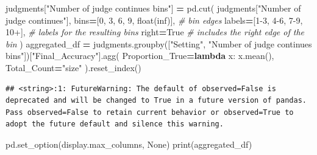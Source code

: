 \documentclass[
]{article}
\newenvironment{Shaded}{\begin{snugshade}}{\end{snugshade}}
\newcommand{\BuiltInTok}[1]{#1}
\newcommand{\CommentTok}[1]{\textcolor[rgb]{0.56,0.35,0.01}{\textit{#1}}}
\newcommand{\DecValTok}[1]{\textcolor[rgb]{0.00,0.00,0.81}{#1}}
\newcommand{\KeywordTok}[1]{\textcolor[rgb]{0.13,0.29,0.53}{\textbf{#1}}}
\newcommand{\NormalTok}[1]{#1}
\newcommand{\OperatorTok}[1]{\textcolor[rgb]{0.81,0.36,0.00}{\textbf{#1}}}
\newcommand{\StringTok}[1]{\textcolor[rgb]{0.31,0.60,0.02}{#1}}
\newcommand{\VariableTok}[1]{\textcolor[rgb]{0.00,0.00,0.00}{#1}}
\begin{document}
\begin{Shaded}
\begin{Highlighting}[]
\NormalTok{judgments[}\StringTok{"Number of judge continues bins"}\NormalTok{] }\OperatorTok{=}\NormalTok{ pd.cut(}
\NormalTok{    judgments[}\StringTok{"Number of judge continues"}\NormalTok{], }
\NormalTok{    bins}\OperatorTok{=}\NormalTok{[}\DecValTok{0}\NormalTok{, }\DecValTok{3}\NormalTok{, }\DecValTok{6}\NormalTok{, }\DecValTok{9}\NormalTok{, }\BuiltInTok{float}\NormalTok{(}\StringTok{\textquotesingle{}inf\textquotesingle{}}\NormalTok{)],  }\CommentTok{\# bin edges}
\NormalTok{    labels}\OperatorTok{=}\NormalTok{[}\StringTok{\textquotesingle{}1{-}3\textquotesingle{}}\NormalTok{, }\StringTok{\textquotesingle{}4{-}6\textquotesingle{}}\NormalTok{, }\StringTok{\textquotesingle{}7{-}9\textquotesingle{}}\NormalTok{, }\StringTok{\textquotesingle{}10+\textquotesingle{}}\NormalTok{],  }\CommentTok{\# labels for the resulting bins}
\NormalTok{    right}\OperatorTok{=}\VariableTok{True}  \CommentTok{\# includes the right edge of the bin}
\NormalTok{)}
\NormalTok{aggregated\_df }\OperatorTok{=}\NormalTok{ judgments.groupby([}\StringTok{"Setting"}\NormalTok{, }\StringTok{"Number of judge continues bins"}\NormalTok{])[}\StringTok{"Final\_Accuracy"}\NormalTok{].agg(}
\NormalTok{    Proportion\_True}\OperatorTok{=}\KeywordTok{lambda}\NormalTok{ x: x.mean(),}
\NormalTok{    Total\_Count}\OperatorTok{=}\StringTok{"size"}
\NormalTok{).reset\_index()}
\end{Highlighting}
\end{Shaded}

\begin{verbatim}
## <string>:1: FutureWarning: The default of observed=False is deprecated and will be changed to True in a future version of pandas. Pass observed=False to retain current behavior or observed=True to adopt the future default and silence this warning.
\end{verbatim}

\begin{Shaded}
\begin{Highlighting}[]
\NormalTok{pd.set\_option(}\StringTok{\textquotesingle{}display.max\_columns\textquotesingle{}}\NormalTok{, }\VariableTok{None}\NormalTok{)}
\BuiltInTok{print}\NormalTok{(aggregated\_df)}
\end{Highlighting}
\end{Shaded}
\end{document}
